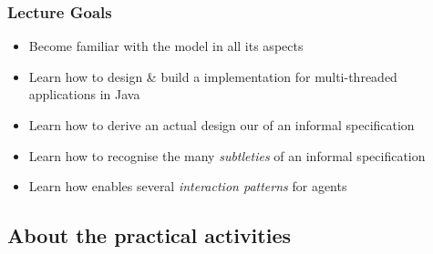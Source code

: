 \documentclass[presentation]{beamer}\mode<presentation>{\usetheme{AMSCesenaPurpleAndGold}}
\begin{document}
\begin{frame}
	\frametitle{Lecture Goals}

	\begin{itemize}

		\item Become familiar with the \linda{} model in all its aspects

		\vfill

		\item Learn how to \alert{design \& build} a \linda{} implementation for multi-threaded applications in Java

		\vfill

		\item Learn how to derive an actual design our of an informal specification

		\vfill

		\item Learn how to recognise the many \emph{subtleties} of an informal specification

		\vfill

		\item Learn how \linda{} enables several \emph{interaction patterns} for agents

	\end{itemize}

\end{frame}

\subsection{About the practical activities}
\end{document}
